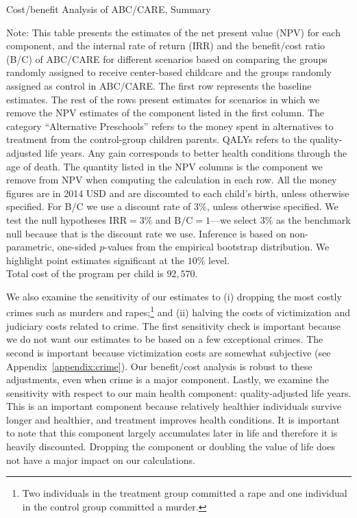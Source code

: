 \begin{table}[H]
\centering
\caption{Cost/benefit Analysis of ABC/CARE, Summary}\label{table:cba}
\begin{threeparttable}
\tiny

\begin{tablenotes}
\footnotesize
\item Note: This table presents the estimates of the net present value (NPV) for each component, and the internal rate of return (IRR) and the benefit/cost ratio (B/C) of ABC/CARE for different scenarios based on comparing the groups randomly assigned to receive center-based childcare and the groups randomly assigned as control in ABC/CARE. The first row represents the baseline estimates. The rest of the rows present estimates for scenarios in which we remove the NPV estimates of the component listed in the first column. The category ``Alternative Preschools'' refers to the money spent in alternatives to treatment from the control-group children parents. QALYs refers to the quality-adjusted life years. Any gain corresponds to better health conditions through the age of death. The quantity listed in the NPV columns is the component we remove from NPV when computing the calculation in each row. All the money figures are in 2014 USD and are discounted to each child's birth, unless otherwise specified. For B/C we use a discount rate of $3\%$, unless otherwise specified. We test the null hypotheses $\text{IRR} = 3\%$ and $\text{B/C} = 1$---we select $3\%$ as the benchmark null because that is the discount rate we use. Inference is based on non-parametric, one-sided $p$-values from the empirical bootstrap distribution. We highlight point estimates significant at the $10\%$ level.\\
    Total cost of the program per child is $92,570$.
\end{tablenotes}
\end{threeparttable}
\end{table}

We also examine the sensitivity of our estimates to (i) dropping the most costly crimes such as murders and rapes;\footnote{Two individuals in the treatment group committed a rape and one individual in the control group committed a murder.} and (ii) halving the costs of victimization and judiciary costs related to crime. The first sensitivity check is important because we do not want our estimates to be based on a few exceptional crimes. The second is important because victimization costs are somewhat subjective (see  Appendix~\ref{appendix:crime}). Our benefit/cost analysis is robust to these adjustments, even when crime is a major component. Lastly, we examine the sensitivity with respect to our main health component: quality-adjusted life years. This is an important component because relatively healthier individuals survive longer and healthier, and treatment improves health conditions. It is important to note that this component largely accumulates later in life and therefore it is heavily discounted. Dropping the component or doubling the value of life does not have a major impact on our calculations.


